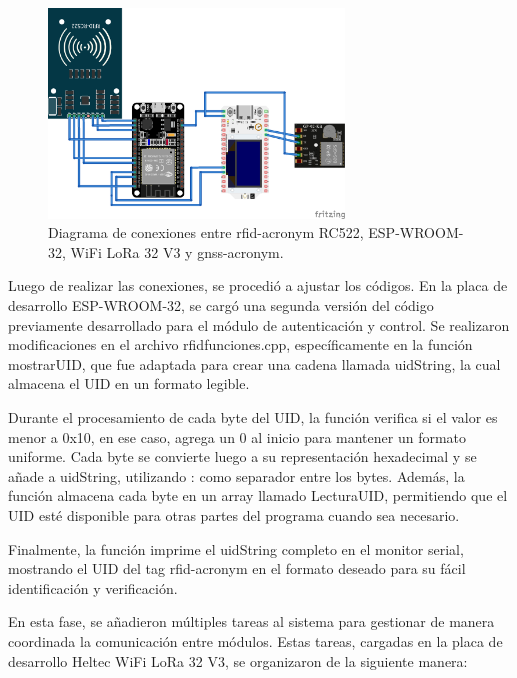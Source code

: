 \begin{figure}[H]
\leavevmode
\begin{minipage}{\textwidth}
\begin{center}
\includegraphics[width=0.7\textwidth]{./capitulo_04/imagen/integracioncompleta.png}
\caption{Diagrama de conexiones entre \acrshort{rfid-acronym} RC522, ESP-WROOM-32, WiFi LoRa 32 V3 y \acrshort{gnss-acronym}.\label{fig:diagramadeconexion}}
\end{center}
\end{minipage}
\end{figure}

Luego de realizar las conexiones, se procedió a ajustar los códigos. En la placa de desarrollo ESP-WROOM-32, se cargó una segunda versión del código previamente desarrollado para el módulo de autenticación y control. Se realizaron modificaciones en el archivo rfidfunciones.cpp, específicamente en la función mostrarUID, que fue adaptada para crear una cadena llamada uidString, la cual almacena el UID en un formato legible.

Durante el procesamiento de cada byte del UID, la función verifica si el valor es menor a 0x10, en ese caso, agrega un 0 al inicio para mantener un formato uniforme. Cada byte se convierte luego a su representación hexadecimal y se añade a uidString, utilizando : como separador entre los bytes. Además, la función almacena cada byte en un array llamado LecturaUID, permitiendo que el UID esté disponible para otras partes del programa cuando sea necesario.

Finalmente, la función imprime el uidString completo en el monitor serial, mostrando el UID del tag \acrshort{rfid-acronym} en el formato deseado para su fácil identificación y verificación.

En esta fase, se añadieron múltiples tareas al sistema para gestionar de manera coordinada la comunicación entre módulos. Estas tareas, cargadas en la placa de desarrollo Heltec WiFi LoRa 32 V3, se organizaron de la siguiente manera:

